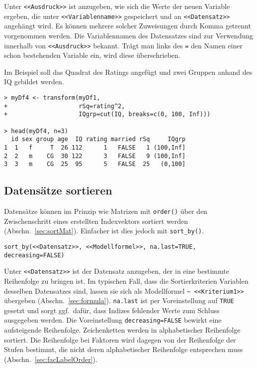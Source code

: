 Unter \lstinline!<<Ausdruck>>! ist anzugeben, wie sich die Werte der neuen Variable ergeben, die unter \lstinline!<<Variablenname>>! gespeichert und an \lstinline!<<Datensatz>>! angehängt wird. Es können mehrere solcher Zuweisungen durch Komma getrennt vorgenommen werden. Die Variablennamen des Datensatzes sind zur Verwendung innerhalb von \lstinline!<<Ausdruck>>! bekannt. Trägt man links des \lstinline!=! den Namen einer schon bestehenden Variable ein, wird diese überschrieben.

Im Beispiel soll das Quadrat des Ratings angefügt und zwei Gruppen anhand des IQ gebildet werden.
\begin{lstlisting}
> myDf4 <- transform(myDf1,
+                    rSq=rating^2,
+                    IQgrp=cut(IQ, breaks=c(0, 100, Inf)))

> head(myDf4, n=3)
  id sex group age  IQ rating married rSq     IQgrp
1  1   f     T  26 112      1   FALSE   1 (100,Inf]
2  2   m    CG  30 122      3   FALSE   9 (100,Inf]
3  3   m    CG  25  95      5   FALSE  25   (0,100]
\end{lstlisting}

\subsection{Datensätze sortieren}
\label{sec:sortDf}

Datensätze können im Prinzip wie Matrizen mit \lstinline!order()! über den Zwischenschritt eines erstellten Indexvektors sortiert werden (Abschn.\ \ref{sec:sortMat}). Einfacher ist dies jedoch mit \lstinline!sort_by()!.
\begin{lstlisting}
sort_by(<<Datensatz>>, <<Modellformel>>, na.last=TRUE, decreasing=FALSE)
\end{lstlisting}

Unter \lstinline!<<Datensatz>>! ist der Datensatz anzugeben, der in eine bestimmte Reihenfolge zu bringen ist. Im typischen Fall, dass die Sortierkriterien Variablen desselben Datensatzes sind, lassen sie sich als Modellformel \lstinline!~ <<Kriterium1>>! übergeben (Abschn.\ \ref{sec:formula}). \lstinline!na.last! ist per Voreinstellung auf \lstinline!TRUE! gesetzt und sorgt ggf.\ dafür, dass Indizes fehlender Werte zum Schluss ausgegeben werden. Die Voreinstellung \lstinline!decreasing=FALSE! bewirkt eine aufsteigende Reihenfolge. Zeichenketten werden in alphabetischer Reihenfolge sortiert. Die Reihenfolge bei Faktoren wird dagegen von der Reihenfolge der Stufen bestimmt, die nicht deren alphabetischer Reihenfolge entsprechen muss (Abschn.\ \ref{sec:facLabelOrder}).

